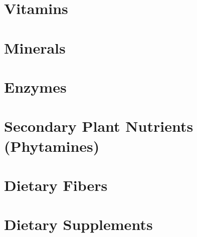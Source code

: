 \documentclass[../main.tex]{subfiles}
\begin{document}


\section{Vitamins}



\section{Minerals}


 
\section{Enzymes}



\section{Secondary Plant Nutrients (Phytamines)}



\section{Dietary Fibers}



\section{Dietary Supplements}


\end{document}
